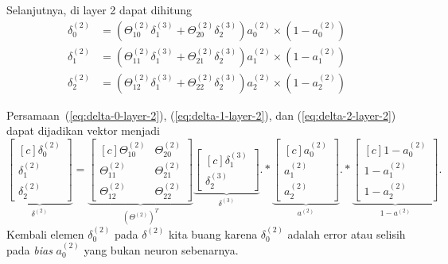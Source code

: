 \documentclass[12pt]{article}
\begin{document}
Selanjutnya, di layer 2 dapat dihitung
\begin{align}
	\delta_0^{(2)} &= (\Theta_{10}^{(2)} \delta_1^{(3)} + \Theta_{20}^{(2)} \delta_2^{(3)}) a_0^{(2)} \times (1-a_0^{(2)}) \label{eq:delta-0-layer-2} \\
	\delta_1^{(2)} &= (\Theta_{11}^{(2)} \delta_1^{(3)} + \Theta_{21}^{(2)} \delta_2^{(3)}) a_1^{(2)} \times (1-a_1^{(2)}) \label{eq:delta-1-layer-2} \\
	\delta_2^{(2)} &= (\Theta_{12}^{(2)} \delta_1^{(3)} + \Theta_{22}^{(2)} \delta_2^{(3)}) a_2^{(2)} \times (1-a_2^{(2)})	\label{eq:delta-2-layer-2}
\end{align}

Persamaan~(\ref{eq:delta-0-layer-2}), (\ref{eq:delta-1-layer-2}), dan (\ref{eq:delta-2-layer-2}) dapat dijadikan vektor menjadi
\begin{equation}
	\underbrace{\begin{bmatrix}[c]
		\delta_0^{(2)} \\
		\delta_1^{(2)} \\
		\delta_2^{(2)}
	\end{bmatrix}}_{\delta^{(2)}}  = \underbrace{\begin{bmatrix}[c]
		\Theta_{10}^{(2)} & \Theta_{20}^{(2)} \\		
		\Theta_{11}^{(2)} & \Theta_{21}^{(2)} \\
		\Theta_{12}^{(2)} & \Theta_{22}^{(2)}
	\end{bmatrix}}_{(\Theta^{(2)})^T}  \underbrace{\begin{bmatrix}[c]
		\delta_1^{(3)} \\
		\delta_2^{(3)}
	\end{bmatrix}}_{\delta^{(3)}}  .* \underbrace{\begin{bmatrix}[c]
		a_0^{(2)} \\		
		a_1^{(2)} \\
		a_2^{(2)}
	\end{bmatrix}}_{a^{(2)}}  .* \underbrace{\begin{bmatrix}[c]
		1-a_0^{(2)} \\
		1-a_1^{(2)} \\
		1-a_2^{(2)}
	\end{bmatrix}}_{1-a^{(2)}}.
\end{equation}
Kembali elemen $\delta_0^{(2)}$ pada $\delta^{(2)}$ kita buang karena $\delta_0^{(2)}$ adalah error atau selisih pada \textit{bias} $a_0^{(2)}$ yang bukan neuron sebenarnya.
\end{document}
